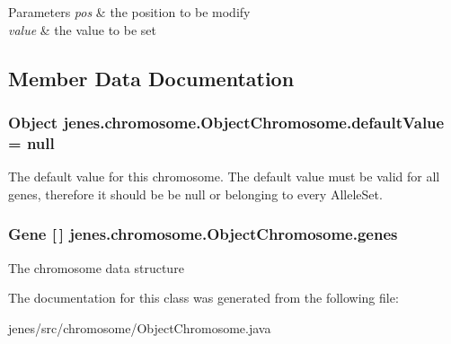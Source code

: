 \begin{DoxyParams}{Parameters}
{\em pos} & the position to be modify \\
\hline
{\em value} & the value to be set \\
\hline
\end{DoxyParams}


\subsection{Member Data Documentation}
\hypertarget{classjenes_1_1chromosome_1_1_object_chromosome_af5e2ac0b5272d948ec566f824baa3411}{
\subsubsection[{default\-Value}]{\setlength{\rightskip}{0pt plus 5cm}Object jenes.\-chromosome.\-Object\-Chromosome.\-default\-Value = null\hspace{0.3cm}{\ttfamily [protected]}}}\label{classjenes_1_1chromosome_1_1_object_chromosome_af5e2ac0b5272d948ec566f824baa3411}
The default value for this chromosome. The default value must be valid for all genes, therefore it should be be {\ttfamily null} or belonging to every {\ttfamily Allele\-Set}. \hypertarget{classjenes_1_1chromosome_1_1_object_chromosome_a33bb9e1cc526fe8e4be0417bbd05a127}{
\subsubsection[{genes}]{\setlength{\rightskip}{0pt plus 5cm}Gene \mbox{[}$\,$\mbox{]} jenes.\-chromosome.\-Object\-Chromosome.\-genes\hspace{0.3cm}{\ttfamily [protected]}}}\label{classjenes_1_1chromosome_1_1_object_chromosome_a33bb9e1cc526fe8e4be0417bbd05a127}
The chromosome data structure 

The documentation for this class was generated from the following file\-:\begin{DoxyCompactItemize}
\item 
jenes/src/chromosome/Object\-Chromosome.\-java\end{DoxyCompactItemize}
